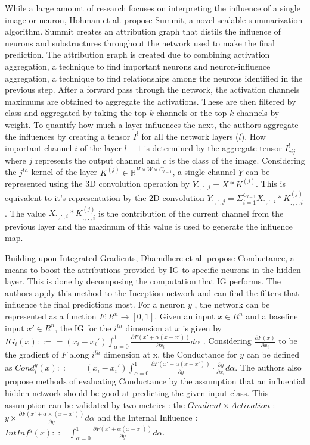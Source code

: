 While a large amount of research focuses on interpreting the influence of a single image or neuron, Hohman et al. propose Summit, \cite{hohmanSummitScalingDeep2019} a novel scalable summarization algorithm. Summit creates an attribution graph that distils the influence of neurons and substructures throughout the network used to make the final prediction. The attribution graph is created due to combining activation aggregation, a technique to find important neurons and neuron-influence aggregation, a technique to find relationships among the neurons identified in the previous step. After a forward pass through the network, the activation channels maximums are obtained to aggregate the activations. These are then filtered by class and aggregated by taking the top $k$ channels or the top $k$ channels by weight. To quantify how much a layer influences the next, the authors aggregate the influences by creating a tensor $I^{l}$ for all the network layers ($l$). How important channel $i$ of the layer $l-1$ is determined by the aggregate tensor $I^{l}_{cij}$ where $j$ represents the output channel and $c$ is the class of the image. Considering the $j^{th}$ kernel of the layer $K^{(j)} \in \mathbb{R}^{H \times W \times C_{l-1}}$, a single channel $Y$ can be represented using the 3D convolution operation by $Y_{:,:,j}= X \ast K^{(j)}$. This is equivalent to it's representation by the 2D convolution $Y_{:,:,j}= \Sigma_{i=1}^{C_{l-1}} X_{:,:,i} \ast K^{(j)}_{:,:,i}$. The value $X_{:,:,i} \ast K^{(j)}_{:,:,i}$ is the contribution of the current channel from the previous layer and the maximum of this value is used to generate the influence map.

Building upon Integrated Gradients, Dhamdhere et al. propose \cite{dhamdhereHowImportantNeuron2018} Conductance, a means to boost the attributions provided by IG to specific neurons in the hidden layer. This is done by decomposing the computation that IG performs. The authors apply this method to the Inception network \cite{szegedyGoingDeeperConvolutions2014} and can find the filters that influence the final predictions most. 
For a neuron $y$ , the network can be represented as a function $F:R^{n} \rightarrow [0,1]$. Given an input $x \in R^{n}$ and a baseline input $x' \in R^{n}$, the IG for the $i^{th}$ dimension at $x$ is given by $IG_{i}(x) ::== (x_{i}- x_{i}') \int_{\alpha=0}^{1} \frac{\partial F(x' + \alpha(x-x'))}{\partial x_{i}}d \alpha$ . Considering $\frac{\partial F(x)}{\partial x_{i}}$ to be the gradient of $F$ along $i^{th}$ dimension at x, the Conductance for $y$ can be defined as $
Cond_{i}^{y}(x) ::== (x_{i}- x_{i}') \int_{\alpha=0}^{1} \frac{\partial F(x' + \alpha(x-x'))}{\partial y} \cdot \frac{\partial y}{\partial x_{i}} d \alpha$. The authors also propose methods of evaluating Conductance by the assumption that an influential hidden network should be good at predicting the given input class. This assumption can be validated by two metrics : the $Gradient\times Activation$ : $
y \times \frac{\partial F(x' + \alpha \times (x-x'))}{\partial y} d \alpha$ and the Internal Influence : $
IntInf ^{y}(x) ::= \int^{1}_{\alpha=0} \frac{\partial F(x' + \alpha(x-x'))}{\partial y} d \alpha$.\\

